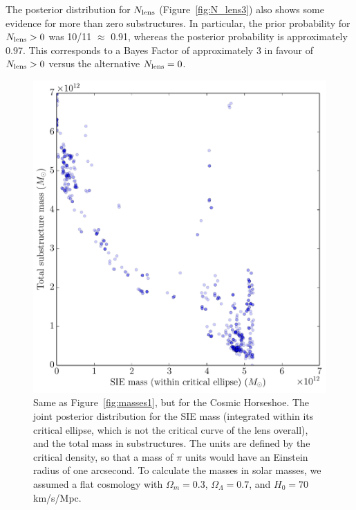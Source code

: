 \documentclass[useAMS,usenatbib]{mn2e}
\newcommand{\revisions}{\color{blue}}
\begin{document}
The posterior distribution for
$N_{\rm lens}$ (Figure~\ref{fig:N_lens3})
also shows some evidence for more than zero substructures.
In particular, the prior probability for $N_{\rm lens} > 0$ was 10/11
$\approx$ 0.91, whereas the posterior probability is approximately 0.97.
This corresponds to a Bayes Factor of approximately 3 in favour of
$N_{\rm lens} > 0$ versus the alternative $N_{\rm lens} = 0$.

\begin{figure}
\begin{center}
\includegraphics[scale=0.4]{masses3.pdf}
\caption{{\revisions Same as Figure~\ref{fig:masses1}, but for the Cosmic Horseshoe.} The joint posterior distribution for the SIE mass (integrated within
its critical ellipse, which is not the critical curve of the lens overall),
and the total mass in substructures. The units are defined by the critical
density, so that a mass of $\pi$ units would have an Einstein radius of one arcsecond. To calculate the masses in solar masses, we assumed a flat cosmology with
$\Omega_m=0.3$, $\Omega_\Lambda=0.7$, and
$H_0=70$ km/s/Mpc.
\label{fig:masses3}}
\end{center}
\end{figure}
\end{document}
